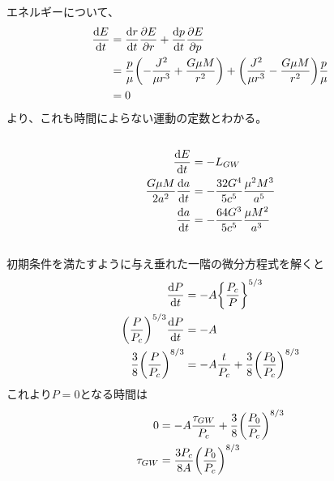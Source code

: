 \documentclass[../../sp_2018.tex]{subfiles}
\begin{document}
エネルギーについて、
\begin{equation}\begin{aligned}[b]
    \dv{E}{t} &= \dv{r}{t}\pdv{E}{r}+\dv{p}{t}\pdv{E}{p}\\
    &= \frac{p}{\mu}\qty(-\frac{J^2}{\mu r^3}+\frac{G\mu M}{r^2})+\qty(\frac{J^2}{\mu r^3}-\frac{G\mu M}{r^2})\frac{p}{\mu}\\
    &= 0
\end{aligned}\end{equation}
より、これも時間によらない運動の定数とわかる。

\subsection{}
\begin{equation}\begin{aligned}[b]
    \dv{E}{t} &= -L_{GW}\\
    \frac{G\mu M}{2a^2}\dv{a}{t} &= -\frac{32G^4}{5c^5}\frac{\mu^2M^3}{a^5}\\
    \dv{a}{t} &=-\frac{64G^3}{5c^5}\frac{\mu M^2}{a^3}
\end{aligned}\end{equation}

\subsection{}
初期条件を満たすように与え垂れた一階の微分方程式を解くと
\begin{equation}\begin{aligned}[b]
    \dv{P}{t} &= -A\qty{\frac{P_c}{P}}^{5/3}\\
    \qty(\frac{P}{P_c})^{5/3} \dv{P}{t} &= -A\\
    \frac{3}{8}\qty(\frac{P}{P_c})^{8/3} &= -A\frac{t}{P_c}+\frac{3}{8}\qty(\frac{P_0}{P_c})^{8/3}
\end{aligned}\end{equation}
これより\(P=0\)となる時間は
\begin{equation}\begin{aligned}[b]
    0 &= -A\frac{\tau_{GW}}{P_c}+\frac{3}{8}\qty(\frac{P_0}{P_c})^{8/3}\\
    \tau_{GW} &=\frac{3P_c}{8A}\qty(\frac{P_0}{P_c})^{8/3}
\end{aligned}\end{equation}
\end{document}
